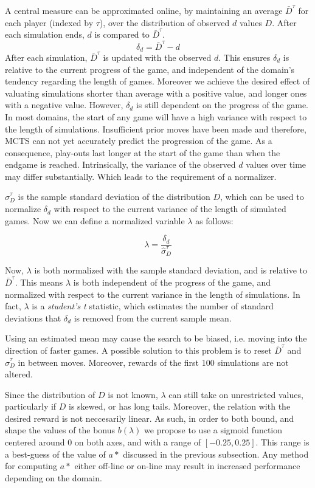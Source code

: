 \documentclass{ecai2014}
\begin{document}
A central measure can be approximated online, by maintaining an average $\bar{D}^\tau$ for each player (indexed by $\tau$), over the distribution of observed $d$ values $D$. After each simulation ends, $d$ is compared to $\bar{D}^\tau$.
\begin{equation}
\delta_d = \bar{D}^\tau - d
\end{equation}
After each simulation, $\bar{D}^\tau$ is updated with the observed $d$. This ensures $\delta_d$ is relative to the current progress of the game, and independent of the domain's tendency regarding the length of games. Moreover we achieve the desired effect of valuating simulations shorter than average with a positive value, and longer ones with a negative value. However, $\delta_d$ is still dependent on the progress of the game. In most domains, the start of any game will have a high variance with respect to the length of simulations. Insufficient prior moves have been made and therefore, MCTS can not yet accurately predict the progression of the game. As a consequence, play-outs last longer at the start of the game than when the endgame is reached. Intrinsically, the variance of the observed $d$ values over time may differ substantially. Which leads to the requirement of a normalizer.

$\hat{\sigma}^\tau_D$ is the sample standard deviation of the distribution $D$, which can be used to normalize $\delta_d$ with respect to the current variance of the length of simulated games. Now we can define a normalized variable $\lambda$ as follows:

\begin{equation}
\lambda = \frac{\delta_d}{\hat{\sigma}^\tau_D}
\end{equation}

Now, $\lambda$ is both normalized with the sample standard deviation, and is relative to $\bar{D}^\tau$. This means $\lambda$ is both independent of the progress of the game, and normalized with respect to the current variance in the length of simulations. In fact, $\lambda$ is a \emph{student's t} statistic, which estimates the number of standard deviations that $\delta_d$ is removed from the current sample mean. 

Using an estimated mean may cause the search to be biased, i.e. moving into the direction of faster games. A possible solution to this problem is to reset $\bar{D}^\tau$ and $\hat{\sigma}^\tau_D$ in between moves. Moreover, rewards of the first 100 simulations are not altered.

Since the distribution of $D$ is not known, $\lambda$ can still take on unrestricted values, particularly if $D$ is skewed, or has long tails. Moreover, the relation with the desired reward is not neccesarily linear. As such, in order to both bound, and shape the values of the bonus $b(\lambda)$ we propose to use a sigmoid function centered around $0$ on both axes, and with a range of $[-0.25, 0.25]$. This range is a best-guess of the value of $a*$ discussed in the previous subsection. Any method for computing $a*$ either off-line or on-line may result in increased performance depending on the domain.
\end{document}

